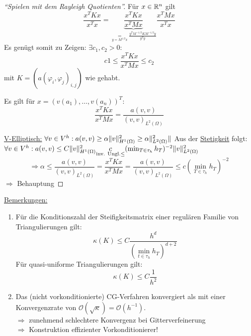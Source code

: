 \begin{proof}[``Spielen mit dem Rayleigh Quotienten'']
  Für $x\in\mathbb{R}^n$ gilt
  \[
    \frac{x^TKx}{x^Tx} = \underbrace{\frac{x^TKx}{x^TMx}}_{\underset{y=M^{1/2}x}{=}\frac{y^TM^{-1/2}KM^{-1/2}y}{y^Ty}} \frac{x^TMx}{x^Tx}
  \]
  Es genügt somit zu Zeigen: $\exists c_1, c_2 >0:$
  \[
    c1 \leq \frac{x^TKx}{x^TMx} \leq c_2
  \]
  mit $K=(a(\varphi_i, \varphi_j)_{i,j})$ wie gehabt. 

  Es gilt für $x=(v(a_1),\ldots, v(a_n))^T$:
  \[
    \frac{x^TKx}{x^TMx} = \frac{a(v,v)}{(v,v)_{L^2(\Omega)}}
  \]

  \underline{V-Elliptisch:} $\forall v\in V^h: a(v,v) \geq \alpha \|v\|^2_{H^1(\Omega)} \geq \alpha \|^2_{L^2(\Omega)}\|$
  Aus der \underline{Stetigkeit} folgt: $\forall v\in V^h: a(v,v) \leq C \|v\|^2_{H^1(\Omega)} \underset{\text{inv. Ungl.}{\leq}} c(\min_{T\in\tau_h} h_T)^{-2} \|v\|^2_{L^2(\Omega)}$
  \[
    \Rightarrow \alpha \leq \frac{a(v,v)}{(v,v)_{L^2(\Omega)}} = \frac{x^TKx}{x^TMx} = \frac{a(v,v)}{(v,v)_{L^2(\Omega)}} \leq c(\min_{T\in\tau_h}h_T)^{-2}
  \]
  $\Rightarrow$ Behauptung
\end{proof}

\underline{Bemerkungen:}
\begin{enumerate}
  \item
    Für die Konditionszahl der Steifigkeitsmatrix einer regulären Familie von Triangulierungen gilt:
    \[ \kappa (K)  \leq C \frac{h^d}{(\min_{t \in \tau_h} h_T)^{d+2}} \]
    Für quasi-uniforme Triangulierungen gilt:
    \[\kappa (K) \leq C \frac{1}{h^2} \]
  \item
    Das (nicht vorkonditionierte) CG-Verfahren konvergiert als mit einer Konvergenzrate von $\mathcal{O}(\sqrt{\kappa})=\mathcal{O}(h^{-1})$. \\
    $\Rightarrow$ zunehmend schlechtere Konvergenz bei Gitterverfeinerung \\
    $\Rightarrow$ Konstruktion effizienter Vorkonditionierer!
\end{enumerate}
